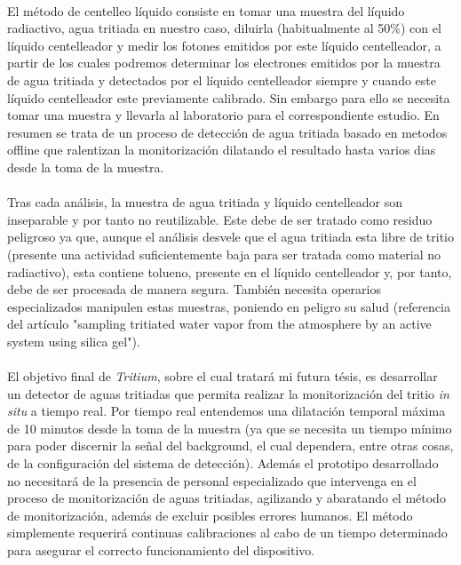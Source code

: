 \paragraph {}
El método de centelleo líquido consiste en tomar una muestra del líquido radiactivo, agua tritiada en nuestro caso, diluirla (habitualmente al 50\%) con el líquido centelleador y medir los fotones emitidos por este líquido centelleador, a partir de los cuales podremos determinar los electrones emitidos por la muestra de agua tritiada y detectados por el líquido centelleador siempre y cuando este líquido centelleador este previamente calibrado. Sin embargo para ello se necesita tomar una muestra y llevarla al laboratorio para el correspondiente estudio. En resumen se trata de un proceso de detección de agua tritiada basado en metodos offline que ralentizan la monitorización dilatando el resultado hasta varios dias desde la toma de la muestra. 

\paragraph {}
Tras cada análisis, la muestra de agua tritiada y líquido centelleador son inseparable y por tanto no reutilizable.  Este debe de ser tratado como residuo peligroso ya que, aunque el análisis desvele que el agua tritiada esta libre de tritio (presente una actividad suficientemente baja para ser tratada como material no radiactivo), esta contiene tolueno, presente en el líquido centelleador y, por tanto, debe de ser procesada de manera segura. También necesita operarios especializados manipulen estas muestras, poniendo en peligro su salud (referencia del artículo "sampling tritiated water vapor from the atmosphere by an active system using silica gel").

\paragraph {}
El objetivo final de \textit{Tritium}, sobre el cual tratará mi futura tésis, es desarrollar un detector de aguas tritiadas que permita realizar la monitorización del tritio \textit{in situ} a tiempo real. Por tiempo real entendemos una dilatación temporal máxima de 10 minutos desde la toma de la muestra (ya que se necesita un tiempo mínimo para poder discernir la señal del background, el cual dependera, entre otras cosas, de la configuración del sistema de detección). Además el prototipo desarrollado no necesitará de la presencia de personal especializado que intervenga en el proceso de monitorización de aguas tritiadas, agilizando y abaratando el método de monitorización, además de excluir posibles errores humanos. El método simplemente requerirá continuas calibraciones al cabo de un tiempo determinado para asegurar el correcto funcionamiento del dispositivo. 

